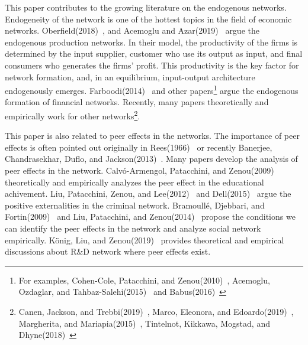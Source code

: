 \documentclass[12pt]{article}
\theoremstyle{definition}
\begin{document}
This paper contributes to the growing literature on the endogenous networks.
Endogeneity of the network is one of the hottest topics in the field of economic networks.
Oberfield(2018)~\cite{ober}, and Acemoglu and Azar(2019)~\cite{endo_net} argue the endogenous production networks.
In their model, the productivity of the firms is determined by the input supplier, customer who use its output as input, and final consumers who generates the firms' profit.
This productivity is the key factor for network formation, and, in an equilibrium, input-output architecture endogenously emerges.
Farboodi(2014)~\cite{farboodi} and other papers\footnote{For examples, Cohen-Cole, Patacchini, and Zenou(2010)~\cite{cohen}, Acemoglu, Ozdaglar, and Tahbaz-Salehi(2015)~\cite{acemo2015} and Babus(2016)~\cite{babus}} argue the endogenous formation of financial networks.
Recently, many papers theoretically and empirically work for other networks\footnote{Canen, Jackson, and Trebbi(2019)~\cite{canen}, Marco, Eleonora, and Edoardo(2019)~\cite{Marco2019}, Margherita, and Mariapia(2015)~\cite{marg}, Tintelnot, Kikkawa, Mogstad, and Dhyne(2018)~\cite{Tin}}.

This paper is also related to peer effects in the networks.
The importance of peer effects is often pointed out originally in Rees(1966)~\cite{Rees} or recently Banerjee, Chandrasekhar, Duflo, and Jackson(2013)~\cite{ban}.
Many papers develop the analysis of peer effects in the network.
Calv\'{o}-Armengol, Patacchini, and Zenou(2009)~\cite{edu} theoretically and empirically analyzes the peer effect in the educational achivement.
Liu, Patacchini, Zenou, and Lee(2012)~\cite{criminal} and Dell(2015)~\cite{Dell} argue the positive externalities in the criminal network.
Bramoull\'{e}, Djebbari, and Fortin(2009)~\cite{identificationpeer} and Liu, Patacchini, and Zenou(2014)~\cite{endopeer} propose the conditions we can identify the peer effects in the network and analyze social network empirically.
K\"{o}nig, Liu, and Zenou(2019)~\cite {RandD} provides theoretical and empirical discussions about R\&D network where peer effects exist.
\end{document}
